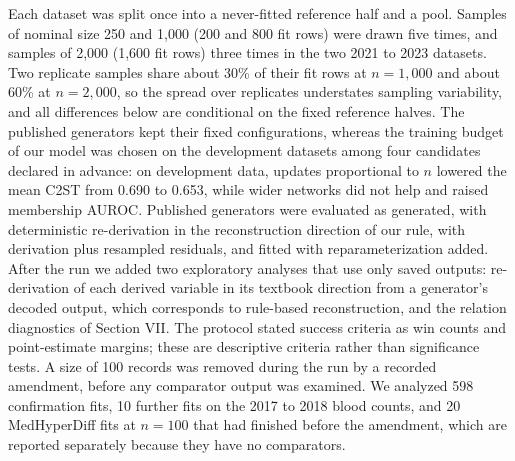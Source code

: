 \documentclass[conference]{IEEEtran}
\begin{document}
Each dataset was split once into a never-fitted reference half and a pool. Samples of nominal size 250 and 1,000 (200 and 800 fit rows) were drawn five times, and samples of 2,000 (1,600 fit rows) three times in the two 2021 to 2023 datasets. Two replicate samples share about 30\% of their fit rows at $n = 1{,}000$ and about 60\% at $n = 2{,}000$, so the spread over replicates understates sampling variability, and all differences below are conditional on the fixed reference halves. The published generators kept their fixed configurations, whereas the training budget of our model was chosen on the development datasets among four candidates declared in advance: on development data, updates proportional to $n$ lowered the mean C2ST from 0.690 to 0.653, while wider networks did not help and raised membership AUROC. Published generators were evaluated as generated, with deterministic re-derivation in the reconstruction direction of our rule, with derivation plus resampled residuals, and fitted with reparameterization added. After the run we added two exploratory analyses that use only saved outputs: re-derivation of each derived variable in its textbook direction from a generator's decoded output, which corresponds to rule-based reconstruction, and the relation diagnostics of Section VII. The protocol stated success criteria as win counts and point-estimate margins; these are descriptive criteria rather than significance tests. A size of 100 records was removed during the run by a recorded amendment, before any comparator output was examined. We analyzed 598 confirmation fits, 10 further fits on the 2017 to 2018 blood counts, and 20 MedHyperDiff fits at $n = 100$ that had finished before the amendment, which are reported separately because they have no comparators.
\end{document}
